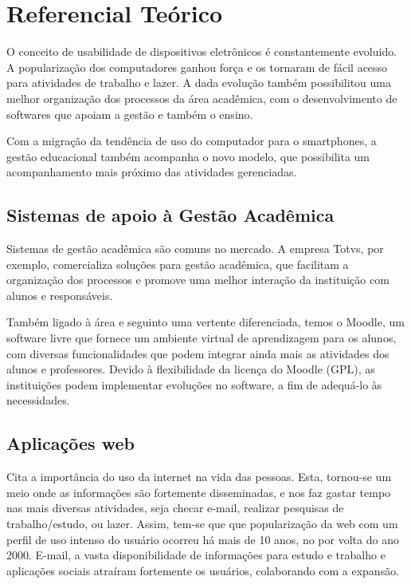 \chapter{Referencial Teórico}


O conceito de usabilidade de dispositivos eletrônicos é constantemente evoluido. A popularização dos computadores ganhou força e os tornaram de fácil acesso para atividades de trabalho e lazer. A dada evolução também possibilitou uma melhor organização dos processos da área acadêmica, com o desenvolvimento de softwares que apoiam a gestão e também o ensino. 


Com a migração da tendência de uso do computador para o smartphones, a gestão educacional também acompanha o novo modelo, que possibilita um acompanhamento mais próximo das atividades gerenciadas. 


\section{Sistemas de apoio à Gestão Acadêmica}


Sistemas de gestão acadêmica são comuns no mercado. A empresa Totvs, por exemplo, comercializa soluções para gestão acadêmica, que facilitam a organização dos processos e promove uma melhor interação da instituição com alunos e responsáveis. 


Também ligado à área e seguinto uma vertente diferenciada, temos o Moodle, um software livre que fornece um ambiente virtual de aprendizagem para os alunos, com diversas funcionalidades que podem integrar ainda mais as atividades dos alunos e professores. Devido à flexibilidade da licença do Moodle (GPL), as instituições podem implementar evoluções no software, a fim de adequá-lo às necessidades.


\section{Aplicações web}

\cite{Slone:2007:ITC:1229015.1229023} Cita a importância do uso da internet na vida das pessoas. Esta, tornou-se um meio onde as informações são fortemente disseminadas, e nos faz gastar tempo nas mais diversas atividades, seja checar e-mail, realizar pesquisas de trabalho/estudo, ou lazer. Assim, tem-se que que popularização da web com um perfil de uso intenso do usuário ocorreu há mais de 10 anos, no por volta do ano 2000. E-mail, a vasta disponibilidade de informações para estudo e trabalho e aplicações sociais atraíram fortemente os usuários, colaborando com a expansão. 


